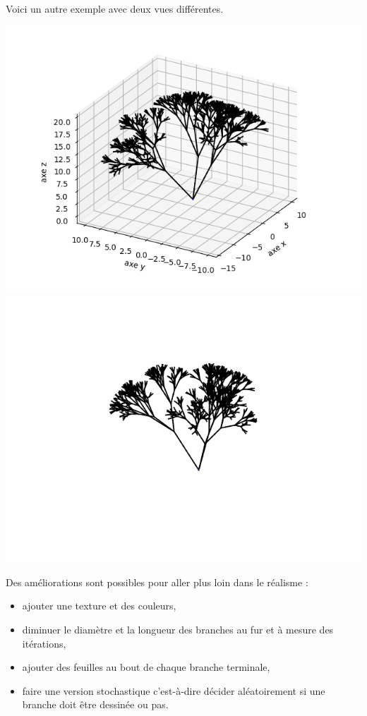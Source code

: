 \documentclass[11pt,class=report,crop=false]{standalone}
\begin{document}
\begin{center}
\end{center}

Voici un autre exemple avec deux vues différentes.
\begin{center}
\includegraphics[scale=\myscale,scale=0.5]{figures/plante3d-02-1}\qquad
\includegraphics[scale=\myscale,scale=0.5]{figures/plante3d-02-2}
\end{center}

Des améliorations sont possibles pour aller plus loin dans le réalisme :
\begin{itemize}
  \item ajouter une texture et des couleurs,
  \item diminuer le diamètre et la longueur des branches au fur et à mesure des itérations,
  \item ajouter des feuilles au bout de chaque branche terminale,
  \item faire une version stochastique c'est-à-dire décider aléatoirement si une branche doit être dessinée ou pas.
\end{itemize}
\end{document}

